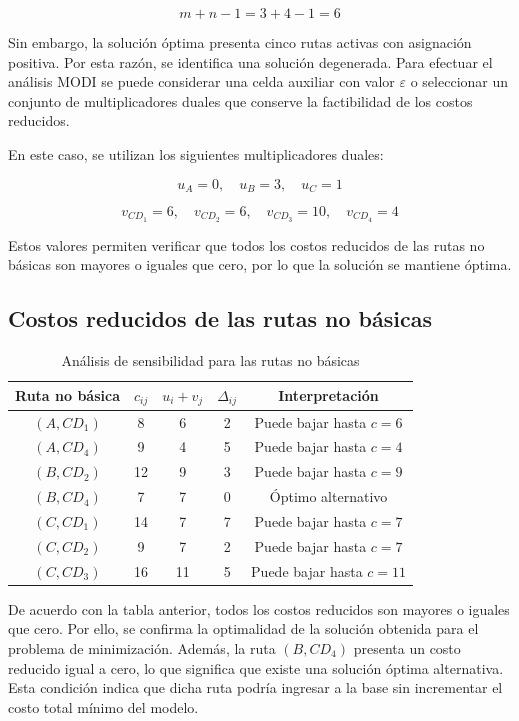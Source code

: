 \documentclass{article}
\renewcommand{\arraystretch}{2.4}
\begin{document}
	\[
	m+n-1 = 3+4-1 = 6
	\]
	
	Sin embargo, la solución óptima presenta cinco rutas activas con asignación positiva. Por
	esta razón, se identifica una solución degenerada. Para efectuar el análisis MODI se puede
	considerar una celda auxiliar con valor $\varepsilon$ o seleccionar un conjunto de
	multiplicadores duales que conserve la factibilidad de los costos reducidos.
	
	En este caso, se utilizan los siguientes multiplicadores duales:
	
	\[
	u_A = 0,\quad u_B = 3,\quad u_C = 1
	\]
	
	\[
	v_{CD_1}=6,\quad v_{CD_2}=6,\quad v_{CD_3}=10,\quad v_{CD_4}=4
	\]
	
	Estos valores permiten verificar que todos los costos reducidos de las rutas no básicas
	son mayores o iguales que cero, por lo que la solución se mantiene óptima.
	
	\subsection{Costos reducidos de las rutas no básicas}
	
	\begin{table}[ht]
		\centering
		\renewcommand{\arraystretch}{1.5}
		\begin{tabular}{ccccc}
			\toprule
			\textbf{Ruta no básica} & $c_{ij}$ & $u_i+v_j$ & $\Delta_{ij}$ & \textbf{Interpretación} \\
			\midrule
			$(A, CD_1)$ & 8  & 6  & 2 & Puede bajar hasta $c=6$ \\
			$(A, CD_4)$ & 9  & 4  & 5 & Puede bajar hasta $c=4$ \\
			$(B, CD_2)$ & 12 & 9  & 3 & Puede bajar hasta $c=9$ \\
			$(B, CD_4)$ & 7  & 7  & 0 & Óptimo alternativo \\
			$(C, CD_1)$ & 14 & 7  & 7 & Puede bajar hasta $c=7$ \\
			$(C, CD_2)$ & 9  & 7  & 2 & Puede bajar hasta $c=7$ \\
			$(C, CD_3)$ & 16 & 11 & 5 & Puede bajar hasta $c=11$ \\
			\bottomrule
		\end{tabular}
		\caption{Análisis de sensibilidad para las rutas no básicas}
	\end{table}
	
	De acuerdo con la tabla anterior, todos los costos reducidos son mayores o iguales que
	cero. Por ello, se confirma la optimalidad de la solución obtenida para el problema de
	minimización. Además, la ruta $(B, CD_4)$ presenta un costo reducido igual a cero, lo que
	significa que existe una solución óptima alternativa. Esta condición indica que dicha ruta
	podría ingresar a la base sin incrementar el costo total mínimo del modelo.
	
\end{document}
